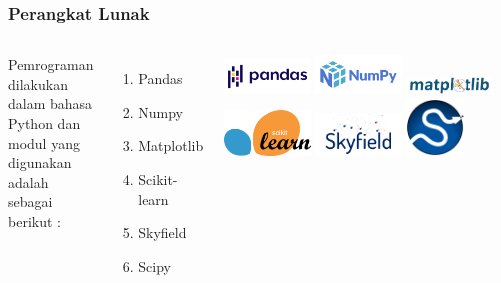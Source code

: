 \documentclass[8pt]{beamer}
\begin{document}
\begin{frame}
  \frametitle{Perangkat Lunak}
  \begin{columns}[c]
  Pemrograman dilakukan dalam bahasa Python dan modul yang digunakan adalah sebagai berikut :
  \begin{enumerate}
    \item Pandas
    \item Numpy
    \item Matplotlib
    \item Scikit-learn
    \item Skyfield
    \item Scipy
  \end{enumerate}
         \includegraphics[width=0.3\textwidth]{figure/pandas.png}
         \includegraphics[width=0.3\textwidth]{figure/numpy.png}
         \includegraphics[width=0.3\textwidth]{figure/matplotlib.png}
         \includegraphics[width=0.3\textwidth]{figure/scikit.png}
         \includegraphics[width=0.3\textwidth]{figure/skyfield.png}
         \includegraphics[width=0.2\textwidth]{figure/scipy.png}
  \end{columns}
\end{frame}
\end{document}
